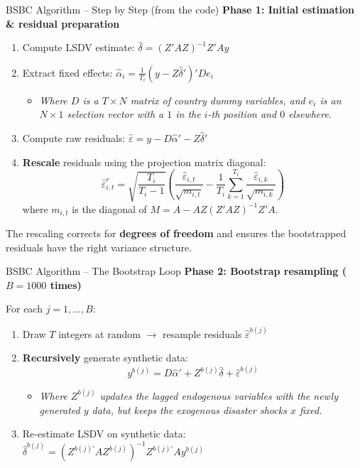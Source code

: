 \documentclass[10pt, aspectratio=169]{beamer}
\begin{document}
\begin{frame}{BSBC Algorithm -- Step by Step (from the code)}
\textbf{Phase 1: Initial estimation \& residual preparation}
\begin{enumerate}
    \item Compute LSDV estimate: $\hat{\delta} = (Z'AZ)^{-1}Z'Ay$
    \item Extract fixed effects: $\hat{\alpha}_i = \frac{1}{T_i}(y - Z\hat{\delta}')' D e_i$
    \begin{itemize}
        \item \footnotesize \textit{Where $D$ is a $T \times N$ matrix of country dummy variables, and $e_i$ is an $N \times 1$ selection vector with a $1$ in the $i$-th position and $0$ elsewhere.} \normalsize
    \end{itemize}
    \item Compute raw residuals: $\hat{\varepsilon} = y - D\hat{\alpha}' - Z\hat{\delta}'$
    \item \textbf{Rescale} residuals using the projection matrix diagonal:
    \[
    \hat{\varepsilon}^r_{i,t} = \sqrt{\frac{T_i}{T_i - 1}} \left( \frac{\hat{\varepsilon}_{i,t}}{\sqrt{m_{i,t}}} - \frac{1}{T_i}\sum_{k=1}^{T_i}\frac{\hat{\varepsilon}_{i,k}}{\sqrt{m_{i,k}}} \right)
    \]
    where $m_{i,t}$ is the diagonal of $M = A - AZ(Z'AZ)^{-1}Z'A$.
\end{enumerate}

\vspace{0.3em}
The rescaling corrects for \textbf{degrees of freedom} and ensures the bootstrapped residuals have the right variance structure.
\end{frame}

\begin{frame}{BSBC Algorithm -- The Bootstrap Loop}
\textbf{Phase 2: Bootstrap resampling ($B = 1000$ times)}

For each $j = 1, \ldots, B$:
\begin{enumerate}
    \item Draw $T$ integers at random $\rightarrow$ resample residuals $\hat{\varepsilon}^{b(j)}$
    \item \textbf{Recursively} generate synthetic data:
    \[
    y^{b(j)} = D\hat{\alpha}' + Z^{b(j)}\hat{\delta} + \hat{\varepsilon}^{b(j)}
    \]
    \vspace{-5mm}
    \begin{itemize}
        \item \footnotesize \textit{Where $Z^{b(j)}$ updates the lagged endogenous variables with the newly generated $y$ data, but keeps the exogenous disaster shocks $x$ fixed.} \normalsize
    \end{itemize}
    \item Re-estimate LSDV on synthetic data: $\hat{\delta}^{b(j)} = (Z^{b(j)\prime}AZ^{b(j)})^{-1}Z^{b(j)\prime}Ay^{b(j)}$
\end{enumerate}
\end{frame}
\end{document}
